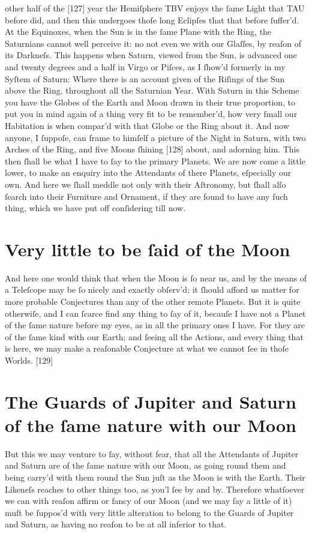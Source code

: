 \documentclass[letterpaper]{book}
\begin{document}
other half of the [127] year the Hemiſphere TBV enjoys the ſame Light that
TAU before did, and then this undergoes thoſe long Eclipſes that that before
ſuffer'd. At the Equinoxes, when the Sun is in the ſame Plane with the Ring,
the Saturnians cannot well perceive it: no not even we with our Glaſſes, by
reaſon of its Darkneſs. This happens when Saturn, viewed from the Sun, is
advanced one and twenty degrees and a half in Virgo or Piſces, as I ſhow'd
formerly in my Syſtem of Saturn: Where there is an account given of the
Riſings of the Sun above the Ring, throughout all the Saturnian Year.  With
Saturn in this Scheme you have the Globes of the Earth and Moon drawn in
their true proportion, to put you in mind again of a thing very fit to be
remember'd, how very ſmall our Habitation is when compar'd with that Globe
or the Ring about it. And now anyone, I ſuppoſe, can frame to himſelf a
picture of the Night in Saturn, with two Arches of the Ring, and five Moons
ſhining [128] about, and adorning him. This then ſhall be what I have to ſay
to the primary Planets.  We are now come a little lower, to make an enquiry
into the Attendants of there Planets, eſpecially our own. And here we ſhall
meddle not only with their Aſtronomy, but ſhall alſo ſearch into their
Furniture and Ornament, if they are found to have any ſuch thing, which we
have put off conſidering till now.


\section{Very little to be ſaid of the Moon}

And here one would think that when the Moon is ſo near us, and by the
means of a Teleſcope may be ſo nicely and exactly obſerv'd; it ſhould afford us matter for more probable Conjectures than any of the other remote
Planets. But it is quite otherwiſe, and I can ſcarce find any thing to ſay
of it, becauſe I have not a Planet of the ſame nature before my eyes, as in
all the primary ones I have. For they are of the ſame kind with our Earth;
and ſeeing all the Actions, and every thing that is here, we may make a
reaſonable Conjecture at what we cannot ſee in thoſe Worlds.
[129]


\section{The Guards of Jupiter and Saturn of the ſame nature with our Moon}

But this we may venture to ſay, without fear, that all the Attendants of
Jupiter and Saturn are of the ſame nature with our Moon, as going round
them and being carry'd with them round the Sun juſt as the Moon is with
the Earth. Their Likeneſs reaches to other things too, as you'l ſee by and
by. Therefore whatſoever we can with reaſon affirm or fancy of our Moon
(and we may ſay a little of it) muſt be ſuppos'd with very little alteration
to belong to the Guards of Jupiter and Saturn, as having no reaſon to be
at all inferior to that.
\end{document}
